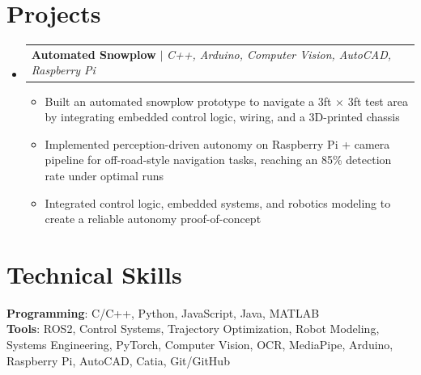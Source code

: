\documentclass[letterpaper,11pt]{article}
\makeatletter
\newcommand{\resumeItem}[1]{
  \item\small{
    {#1 \vspace{-2pt}}
  }
}
\newcommand{\resumeProjectHeading}[2]{
    \item
    \begin{tabular*}{0.97\textwidth}{l@{\extracolsep{\fill}}r}
      \small#1 & #2 \\
    \end{tabular*}\vspace{-7pt}
}
\newcommand{\resumeSubHeadingListStart}{\begin{itemize}[leftmargin=0.15in, label={}]}
\newcommand{\resumeSubHeadingListEnd}{\end{itemize}}
\newcommand{\resumeItemListStart}{\begin{itemize}}
\newcommand{\resumeItemListEnd}{\end{itemize}\vspace{-5pt}}
\makeatother
\begin{document}
\section{Projects}
    \resumeSubHeadingListStart
      \resumeProjectHeading
          {\textbf{Automated Snowplow} $|$ \emph{C++, Arduino, Computer Vision, AutoCAD, Raspberry Pi}}{}
          \resumeItemListStart
            \resumeItem{Built an automated snowplow prototype to navigate a 3ft $\times$ 3ft test area by integrating embedded control logic, wiring, and a 3D-printed chassis}
            \resumeItem{Implemented perception-driven autonomy on Raspberry Pi + camera pipeline for off-road-style navigation tasks, reaching an 85\% detection rate under optimal runs}
            \resumeItem{Integrated control logic, embedded systems, and robotics modeling to create a reliable autonomy proof-of-concept}
          \resumeItemListEnd
    \resumeSubHeadingListEnd

%
\section{Technical Skills}
 \begin{itemize}[leftmargin=0.15in, label={}]
    \small{\item{
     \textbf{Programming}{: C/C++, Python, JavaScript, Java, MATLAB} \\
     \textbf{Tools}{: ROS2, Control Systems, Trajectory Optimization, Robot Modeling, Systems Engineering, PyTorch, Computer Vision, OCR, MediaPipe, Arduino, Raspberry Pi, AutoCAD, Catia, Git/GitHub}
    }}
 \end{itemize}


\end{document}
